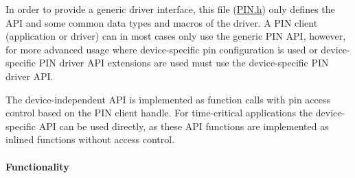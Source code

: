 In order to provide a generic driver interface, this file (\hyperlink{_p_i_n_8h}{P\-I\-N.\-h}) only defines the A\-P\-I and some common data types and macros of the driver. A P\-I\-N client (application or driver) can in most cases only use the generic P\-I\-N A\-P\-I, however, for more advanced usage where device-\/specific pin configuration is used or device-\/specific P\-I\-N driver A\-P\-I extensions are used must use the device-\/specific P\-I\-N driver A\-P\-I.

The device-\/independent A\-P\-I is implemented as function calls with pin access control based on the P\-I\-N client handle. For time-\/critical applications the device-\/specific A\-P\-I can be used directly, as these A\-P\-I functions are implemented as inlined functions without access control.

\paragraph*{Functionality}

